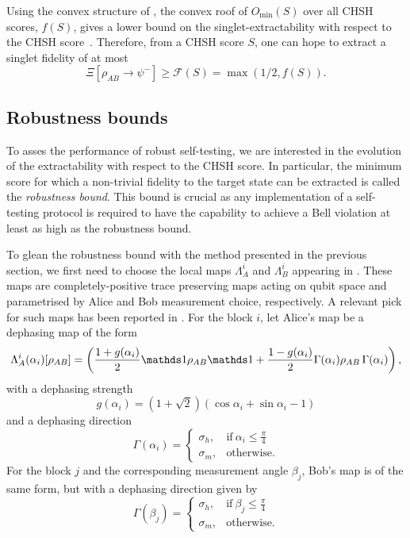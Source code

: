 Using the convex structure of , the convex roof of $O_{\min}(S)$ over all CHSH scores, $f(S)$, gives a lower bound on the singlet-extractability with respect to the CHSH score~\cite{Sekatski2018}.
Therefore, from a CHSH score $S$, one can hope to extract a singlet fidelity of at most 
\begin{equation}
	\Xi [\rho_{AB} \rightarrow \psi^{-}] \geq \mathcal{F}(S)=\max\left(1/2, f(S)\right).
\end{equation}

\subsection{Robustness bounds}

To asses the performance of robust self-testing, we are interested in the evolution of the extractability with respect to the CHSH score.
In particular, the minimum score for which a non-trivial fidelity to the target state can be extracted is called the \textit{robustness bound}.
This bound is crucial as any implementation of a self-testing protocol is required to have the capability to achieve a Bell violation at least as high as the robustness bound.

To glean the robustness bound with the method presented in the previous section, we first need to choose the local maps $\Lambda_A^i$ and $\Lambda_B^i$ appearing in .
These maps are completely-positive trace preserving maps acting on qubit space and parametrised by Alice and Bob measurement choice, respectively.
A relevant pick for such maps has been reported in \cite{Kaniewski2016}.
For the block $i$, let Alice's map be a dephasing map of the form
\begin{equation}
	\Lambda_A^i(\alpha_i)[\rho_{AB}] = \left( \frac{1+g(\alpha_i)}{2}\id\rho_{AB}\id+\frac{1-g(\alpha_i)}{2}\Gamma(\alpha_i)\rho_{AB}\,\Gamma(\alpha_i)\right),
	\label{eq:dephasing_maps}
\end{equation}
with a dephasing strength
\begin{equation}
	g(\alpha_i)=(1+\sqrt{2})(\cos{\alpha_i}+\sin{\alpha_i}-1)
	\label{eq:dephasing_strength}
\end{equation}
and a dephasing direction
\begin{equation}
	\Gamma(\alpha_i) = \begin{cases}
      \sigma_h, & \text{if}\ \alpha_i\leq\frac{\pi}{4} \\
      \sigma_m, & \text{otherwise}.
    \end{cases}
	\label{eq:dephasing_direction_alice}
\end{equation}
For the block $j$ and the corresponding measurement angle $\beta_j$, Bob's map is of the same form, but with a dephasing direction given by
\begin{equation}
	\Gamma(\beta_j) = \begin{cases}
      \sigma_h, & \text{if}\ \beta_j\leq\frac{\pi}{4} \\
      \sigma_m, & \text{otherwise}.
    \end{cases}
	\label{eq:dephasing_direction_bob}
\end{equation}

